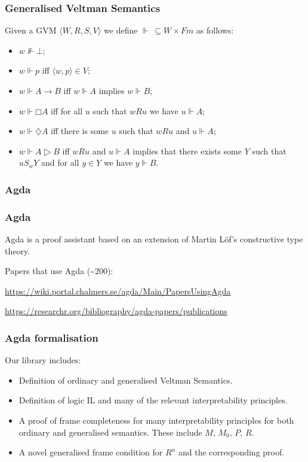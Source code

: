 \documentclass{beamer}
\begin{document}
\begin{frame}
  \frametitle{Generalised Veltman Semantics}
  Given a GVM $⟨W,R,S,V⟩$ we define $⊩\ ⊆W×Fm$ as follows:
  \begin{itemize}
    \item $w⊮⊥$;
    \item $w⊩p$ iff $⟨w,p⟩∈V$;
    \item $w⊩A→B$ iff $w⊩A$ implies $w⊩B$;
    \item $w⊩□A$ iff for all $u$ such that $wRu$ we have $u⊩A$;
    \item $w⊩♢A$ iff there is some $u$ such that $wRu$ and $u⊩A$;
      \pause
    \item $w⊩A▷B$ iff $wRu$ and $u⊩A$ implies that there exists some $Y$ such
      that $uS_wY$ and for all $y∈Y$ we have $y⊩B$.
  \end{itemize}
\end{frame}

\begin{frame}
  \frametitle{Agda}
\end{frame}

\begin{frame}
  \frametitle{Agda}

  Agda is a proof assistant based on an extension of Martin Löf's constructive
  type theory.

  \vspace{0.4cm}

  Papers that use Agda (\textasciitilde 200):

  \url{https://wiki.portal.chalmers.se/agda/Main/PapersUsingAgda}

  \vspace{0.3cm}

  \url{https://researchr.org/bibliography/agda-papers/publications}
\end{frame}

\begin{frame}
  \frametitle{Agda formalisation}
  Our library includes:
  \begin{itemize}
  \item Definition of ordinary and generalised Veltman Semantics.
  \item Definition of logic IL and many of the relevant interpretability
    principles.
  \item A proof of frame completeness for many interpretability principles for
    both ordinary and generalised semantics. These include $M$, $M_0$, $P$, $R$.
  \item A novel generalised frame condition for $R^n$ and the corresponding
    proof.
  \end{itemize}
\end{frame}
\end{document}
